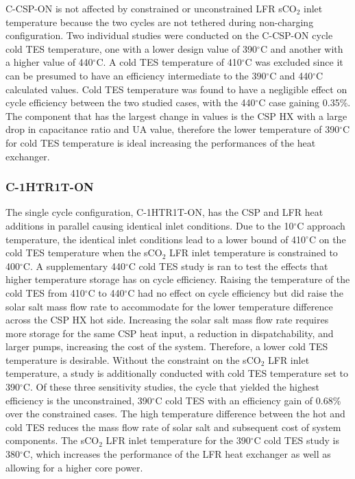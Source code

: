 \begin{paracol}{2}
C-CSP-ON is not affected by constrained or unconstrained LFR sCO$_2$ inlet temperature because the two cycles are not tethered during non-charging configuration. Two individual studies were conducted on the C-CSP-ON cycle cold TES temperature, one with a lower design value of 390$^{\circ}$C and another with a higher value of 440$^{\circ}$C. A cold TES temperature of 410$^{\circ}$C was excluded since it can be presumed to have an efficiency intermediate to the 390$^{\circ}$C and 440$^{\circ}$C calculated values. Cold TES temperature was found to have a negligible effect on cycle efficiency between the two studied cases, with the 440$^{\circ}$C case gaining 0.35\%. The component that has the largest change in values is the CSP HX with a large drop in capacitance ratio and UA value, therefore the lower temperature of 390$^{\circ}$C for cold TES temperature is ideal increasing the performances of the heat exchanger. 


\subsubsection{C-1HTR1T-ON}
The single cycle configuration, C-1HTR1T-ON, has the CSP and LFR heat additions in parallel causing identical inlet conditions. Due to the 10$^{\circ}$C approach temperature, the identical inlet conditions lead to a lower bound of 410$^{\circ}$C on the cold TES temperature when the sCO$_2$ LFR inlet temperature is constrained to 400$^{\circ}$C. A supplementary 440$^{\circ}$C cold TES study is ran to test the effects that higher temperature storage has on cycle efficiency. Raising the temperature of the cold TES from 410$^{\circ}$C to 440$^{\circ}$C had no effect on cycle efficiency but did raise the solar salt mass flow rate to accommodate for the lower temperature difference across the CSP HX hot side. Increasing the solar salt mass flow rate requires more storage for the same CSP heat input, a reduction in dispatchability, and larger pumps, increasing the cost of the system. Therefore, a lower cold TES temperature is desirable. Without the constraint on the sCO$_2$ LFR inlet temperature, a study is additionally conducted with cold TES temperature set to 390$^{\circ}$C. Of these three sensitivity studies, the cycle that yielded the highest efficiency is the unconstrained, 390$^{\circ}$C cold TES with an efficiency gain of 0.68\% over the constrained cases. The high temperature difference between the hot and cold TES reduces the mass flow rate of solar salt and subsequent cost of system components. The sCO$_2$ LFR inlet temperature for the 390$^{\circ}$C cold TES study is 380$^{\circ}$C, which increases the performance of the LFR heat exchanger as well as allowing for a higher core power. 


\end{paracol}
